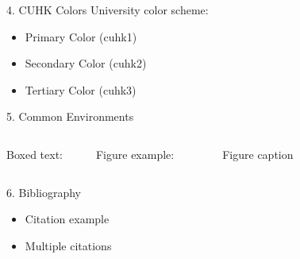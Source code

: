 \documentclass[10pt]{beamer}
\begin{document}

\begin{frame}{4. CUHK Colors}
    University color scheme:
    \begin{itemize}
        \item \textcolor{cuhk1}{Primary Color (cuhk1)}
        \item \textcolor{cuhk2}{Secondary Color (cuhk2)}
        \item \textcolor{cuhk3}{Tertiary Color (cuhk3)}
    \end{itemize}
    
    \begin{center}
        \boxed{\textcolor{cuhk1}{Colored Boxed Text}}
    \end{center}
\end{frame}


\begin{frame}{5. Common Environments}
    \begin{columns}
        Boxed text:
        \begin{center}
        \end{center}
        
        Figure example:
        \begin{figure}
            \centering
            \caption{Figure caption}
        \end{figure}
    \end{columns}
\end{frame}


\begin{frame}{6. Bibliography}
    \begin{itemize}
        \item Citation example\cite{example2023}
        \item Multiple citations\cite{example2023,example2024}
    \end{itemize}
    
    \begin{center}
        \large
    \end{center}
\end{frame}
\end{document}
